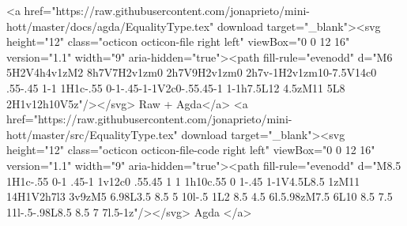 {        <a href="https://raw.githubusercontent.com/jonaprieto/mini-hott/master/docs/agda/EqualityType.tex" download target="_blank"><svg height="12" class="octicon octicon-file right left" viewBox="0 0 12 16" version="1.1" width="9" aria-hidden="true"><path fill-rule="evenodd" d="M6 5H2V4h4v1zM2 8h7V7H2v1zm0 2h7V9H2v1zm0 2h7v-1H2v1zm10-7.5V14c0 .55-.45 1-1 1H1c-.55 0-1-.45-1-1V2c0-.55.45-1 1-1h7.5L12 4.5zM11 5L8 2H1v12h10V5z"/></svg> Raw + Agda</a>
        <a href="https://raw.githubusercontent.com/jonaprieto/mini-hott/master/src/EqualityType.tex" download target="_blank"><svg height="12" class="octicon octicon-file-code right left" viewBox="0 0 12 16" version="1.1" width="9" aria-hidden="true"><path fill-rule="evenodd" d="M8.5 1H1c-.55 0-1 .45-1 1v12c0 .55.45 1 1 1h10c.55 0 1-.45 1-1V4.5L8.5 1zM11 14H1V2h7l3 3v9zM5 6.98L3.5 8.5 5 10l-.5 1L2 8.5 4.5 6l.5.98zM7.5 6L10 8.5 7.5 11l-.5-.98L8.5 8.5 7 7l.5-1z"/></svg> Agda </a>
      
}
